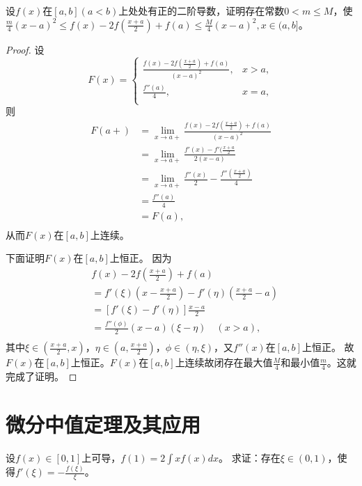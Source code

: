  \begin{exercise}
 设$f(x)$在$[a,b](a<b)$上处处有正的二阶导数，证明存在常数$0<m\leq M$，使$\frac m4(x-a)^2\leq f(x)-2f(\frac{x+a}2)+f(a)\leq \frac M4(x-a)^2,x\in(a,b]$。
  \end{exercise}
  
  \begin{proof}
  设$$F(x)=
  \begin{cases}
  \frac{f(x)-2f(\frac{x+a}{2})+f(a)}{(x-a)^2},&x>a,\\
  \frac{f''(a)}{4},&x=a,\\
  \end{cases}
  $$
  则
  \begin{align*}
  F(a+)&=\lim_{x\rightarrow a+}\frac{f(x)-2f(\frac{x+a}{2})+f(a)}{(x-a)^2}\\
  &=\lim_{x\rightarrow a+}\frac{f'(x)-f'(\frac{x+a}{2}}{2(x-a)}\\
  &=\lim_{x\rightarrow a+}\frac{f''(x)}{2}-\frac{f''(\frac{x+a}{2})}{4}\\
  &=\frac{f''(a)}{4}\\
  &=F(a),\\
  \end{align*}
  从而$F(x)$在$[a,b]$上连续。
  
  下面证明$F(x)$在$[a,b]$上恒正。
 因为
 \begin{align*}
 &f(x)-2f(\frac{x+a}{2})+f(a)\\
 &=f'(\xi)(x-\frac{x+a}{2})-f'(\eta)(\frac{x+a}{2}-a)\\
 &=[f'(\xi)-f'(\eta)]\frac{x-a}{2}\\
 &=\frac{f''(\phi)}2(x-a)(\xi-\eta)\quad(x>a),\\
 \end{align*}
 其中$\xi\in(\frac{x+a}{2},x)$，$\eta\in(a,\frac{x+a}{2})$，$\phi\in(\eta,\xi)$，又$f''(x)$在$[a,b]$上恒正。
 故$F(x)$在$[a,b]$上恒正。$F(x)$在$[a,b]$上连续故闭存在最大值$\frac{M}{4}$和最小值$\frac{m}{4}$。这就完成了证明。  
  \end{proof}  

  \section{微分中值定理及其应用}

  \begin{example}
    设$f(x)\in[0,1]$上可导，$f(1)=2\int xf(x)dx$。
    求证：存在$\xi\in(0,1)$，使得$f'(\xi)=-\frac{f(\xi)}{\xi}$。
  \end{example}
  
